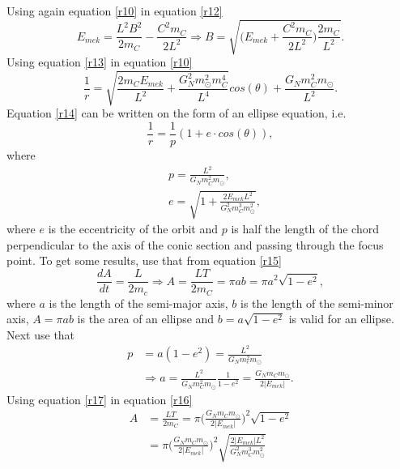 \begin{example}
\begin{enumerate}
		Using again equation \eqref{r10} in equation \eqref{r12}
		\begin{equation}
			E_{mek}=\frac{L^2B^2}{2m_C}-\frac{C^2m_C}{2L^2}\Rightarrow B=\sqrt{\bigg(E_{mek}+\frac{C^2m_C}{2L^2}\bigg)\frac{2m_C}{L^2}}.
			\label{r13}
		\end{equation} 
		Using equation \eqref{r13} in equation \eqref{r10}
		\begin{equation}
			\frac{1}{r}=\sqrt{\frac{2m_CE_{mek}}{L^2}+\frac{G_N^2m_\odot^2m_C^4}{L^4}}cos(\theta)+\frac{G_Nm_C^2m_\odot}{L^2}.
			\label{r14}
		\end{equation} 
		Equation \eqref{r14} can be written on the form of an ellipse equation,  i.e.
		\begin{equation}
			\frac{1}{r}=\frac{1}{p}(1+e\cdot cos(\theta)),
		\end{equation} 
		where
		\begin{equation}
			\begin{split}
				&p=\frac{L^2}{G_Nm_C^2m_\odot},\\
				&e=\sqrt{1+\frac{2E_{mek}L^2}{G_N^2m_C^3m_\odot^2}},
			\end{split}
		\end{equation} 
		where $e$ is the eccentricity of the orbit and $p$ is half the length of the chord perpendicular to the axis of the conic section and passing through the focus point. To get some results, use that from equation \eqref{r15}
		\begin{equation}
			\frac{dA}{dt}=\frac{L}{2m_c}\Rightarrow A=\frac{LT}{2m_C}=\pi ab=\pi a^2\sqrt{1-e^2},
			\label{r16}
		\end{equation} 
		where $a$ is the length of the semi-major axis, $b$ is the length of the semi-minor axis, $A=\pi ab$ is the area of an ellipse and $b=a\sqrt{1-e^2}$ is valid for an ellipse. Next use that
		\begin{equation}
			\begin{split}
				p&=a(1-e^2)=\frac{L^2}{G_Nm_c^2m_\odot}\\
				&\Rightarrow a=\frac{L^2}{G_Nm_C^2m_\odot}\frac{1}{1-e^2}=\frac{G_Nm_Cm_\odot}{2|E_{mek}|}.
			\end{split}
			\label{r17}
		\end{equation} 
		Using equation \eqref{r17} in equation \eqref{r16}
		\begin{equation}
			\begin{split}
				A&=\frac{LT}{2m_C}=\pi\bigg(\frac{G_Nm_Cm_\odot}{2|E_{mek}|}\bigg)^2\sqrt{1-e^2}\\
				&=\pi\bigg(\frac{G_Nm_Cm_\odot}{2|E_{mek}|}\bigg)^2\sqrt{\frac{2|E_{mek}|L^2}{G_N^2m_C^3m_\odot^2}}\\

\end{split}
\end{equation}
\end{enumerate}
\end{example}
